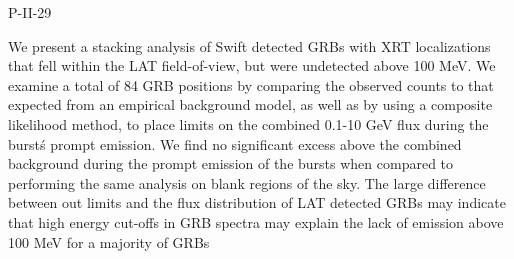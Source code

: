 P-II-29


\bigskip



\bigskip

\noindent We present a stacking analysis of Swift detected GRBs with XRT localizations that fell within the LAT field-of-view, but were undetected above 100 MeV. We examine a total of 84 GRB positions by comparing the observed counts to that expected from an empirical background model, as well as by using a composite likelihood method, to place limits on the combined  0.1-10 GeV flux during the burst\'s prompt emission. We find no significant excess above the combined background during the prompt emission of the bursts when compared to performing the same analysis on blank regions of the sky. The large difference between out limits and the flux distribution of LAT detected GRBs may indicate that high energy cut-offs in GRB spectra may explain the lack of emission above 100 MeV for a majority of GRBs

